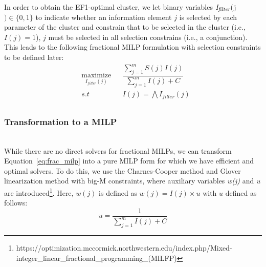 In order to obtain the EF1-optimal cluster, we let binary variables $\emph{I\textsubscript{filter}}($j$) \in \{0, 1\}$ to indicate whether an information element $j$ is selected by each parameter of the cluster and constrain that to be selected in the cluster (i.e., $I(j)=1$), $j$ must be selected in all selection constrains (i.e., a conjunction).  This leads to the following fractional MILP formulation with selection constraints to be defined later:
\begin{equation}
\begin{aligned}
& \underset{I_{\mathit{filter}}(j)}{\text{maximize}}
& & \dfrac{\sum_{j=1}^m S(j)I(j)}{\sum_{j=1}^m I(j) + C} \\
& s.t
& & I(j) = \bigwedge I_{\mathit{filter}}(j) \\
\end{aligned} \label{eq:frac_milp}
\end{equation}


\subsubsection{Transformation to a MILP} \hfill \\
While there are no direct solvers for fractional MILPs, we can transform Equation~\eqref{eq:frac_milp} into a pure MILP form for which we have efficient and optimal solvers.  To do this, we use the Charnes-Cooper method \cite{Charnes1962} and Glover linearization method \cite{Glover1975} with big-M constraints, where auxiliary variables \emph{w(j)} and \emph{u} are  introduced\footnote{https://optimization.mccormick.northwestern.edu/index.php/Mixed-integer\_linear\_fractional\_programming\_(MILFP)}. Here, $w(j)$ is defined as $w(j)=I(j)\times u$ with $u$ defined as follows:
\begin{equation}
u = \dfrac{1}{\sum_{j=1}^m I(j) + C}
\end{equation}

